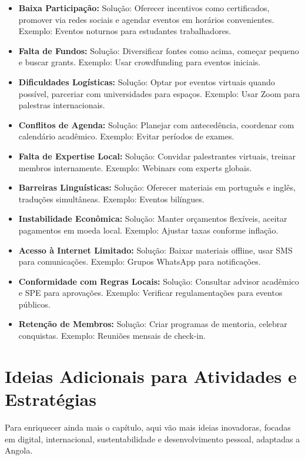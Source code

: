 \documentclass[12pt]{article}
\begin{document}
\begin{itemize}
    \item \textbf{Baixa Participação:} Solução: Oferecer incentivos como certificados, promover via redes sociais e agendar eventos em horários convenientes. Exemplo: Eventos noturnos para estudantes trabalhadores.
    \item \textbf{Falta de Fundos:} Solução: Diversificar fontes como acima, começar pequeno e buscar grants. Exemplo: Usar crowdfunding para eventos iniciais.
    \item \textbf{Dificuldades Logísticas:} Solução: Optar por eventos virtuais quando possível, parceriar com universidades para espaços. Exemplo: Usar Zoom para palestras internacionais.
    \item \textbf{Conflitos de Agenda:} Solução: Planejar com antecedência, coordenar com calendário acadêmico. Exemplo: Evitar períodos de exames.
    \item \textbf{Falta de Expertise Local:} Solução: Convidar palestrantes virtuais, treinar membros internamente. Exemplo: Webinars com experts globais.
    \item \textbf{Barreiras Linguísticas:} Solução: Oferecer materiais em português e inglês, traduções simultâneas. Exemplo: Eventos bilíngues.
    \item \textbf{Instabilidade Econômica:} Solução: Manter orçamentos flexíveis, aceitar pagamentos em moeda local. Exemplo: Ajustar taxas conforme inflação.
    \item \textbf{Acesso à Internet Limitado:} Solução: Baixar materiais offline, usar SMS para comunicações. Exemplo: Grupos WhatsApp para notificações.
    \item \textbf{Conformidade com Regras Locais:} Solução: Consultar advisor acadêmico e SPE para aprovações. Exemplo: Verificar regulamentações para eventos públicos.
    \item \textbf{Retenção de Membros:} Solução: Criar programas de mentoria, celebrar conquistas. Exemplo: Reuniões mensais de check-in.
\end{itemize}

\section{Ideias Adicionais para Atividades e Estratégias}

Para enriquecer ainda mais o capítulo, aqui vão mais ideias inovadoras, focadas em digital, internacional, sustentabilidade e desenvolvimento pessoal, adaptadas a Angola.
\end{document}
